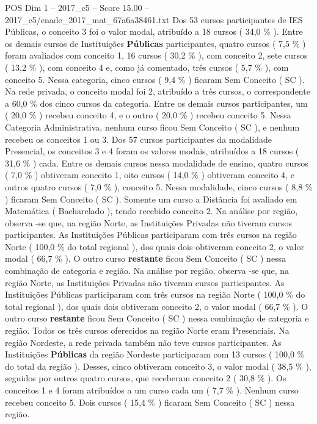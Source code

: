 \begin{textsample}{POS Dim 1 – 2017\_c5 – Score 15.00 – 2017\_c5/enade\_2017\_mat\_67a6a38461.txt}
Dos 53 cursos participantes de IES Públicas, o conceito 3 foi o valor modal, atribuído a 18 cursos ( 34,0 \% ).
Entre os demais cursos de Instituições \textbf{Públicas} participantes, quatro cursos ( 7,5 \% ) foram avaliados com conceito 1, 16 cursos ( 30,2 \% ), com conceito 2, sete cursos ( 13,2 \% ), com conceito 4 e, como já comentado, três cursos ( 5,7 \% ), com conceito 5.
Nessa categoria, cinco cursos ( 9,4 \% ) ficaram Sem Conceito ( SC ).
Na rede privada, o conceito modal foi 2, atribuído a três cursos, o correspondente a 60,0 \% dos cinco cursos da categoria.
Entre os demais cursos participantes, um ( 20,0 \% ) recebeu conceito 4, e o outro ( 20,0 \% ) recebeu conceito 5.
Nessa Categoria Administrativa, nenhum curso ficou Sem Conceito ( SC ), e nenhum recebeu os conceitos 1 ou 3.
Dos 57 cursos participantes da modalidade Presencial, os conceitos 3 e 4 foram os valores modais, atribuídos a 18 cursos ( 31,6 \% ) cada.
Entre os demais cursos nessa modalidade de ensino, quatro cursos ( 7,0 \% ) obtiveram conceito 1, oito cursos ( 14,0 \% ) obtiveram conceito 4, e outros quatro cursos ( 7,0 \% ), conceito 5.
Nessa modalidade, cinco cursos ( 8,8 \% ) ficaram Sem Conceito ( SC ).
Somente um curso a Distância foi avaliado em Matemática ( Bacharelado ), tendo recebido conceito 2.
Na análise por região, observa -se que, na região Norte, as Instituições Privadas não tiveram cursos participantes.
As Instituições Públicas participaram com três cursos na região Norte ( 100,0 \% do total regional ), dos quais dois obtiveram conceito 2, o valor modal ( 66,7 \% ).
O outro curso \textbf{restante} ficou Sem Conceito ( SC ) nessa combinação de categoria e região.
Na análise por região, observa -se que, na região Norte, as Instituições Privadas não tiveram cursos participantes.
As Instituições Públicas participaram com três cursos na região Norte ( 100,0 \% do total regional ), dos quais dois obtiveram conceito 2, o valor modal ( 66,7 \% ).
O outro curso \textbf{restante} ficou Sem Conceito ( SC ) nessa combinação de categoria e região.
Todos os três cursos oferecidos na região Norte eram Presenciais.
Na região Nordeste, a rede privada também não teve cursos participantes.
As Instituições \textbf{Públicas} da região Nordeste participaram com 13 cursos ( 100,0 \% do total da região ).
Desses, cinco obtiveram conceito 3, o valor modal ( 38,5 \% ), seguidos por outros quatro cursos, que receberam conceito 2 ( 30,8 \% ).
Os conceitos 1 e 4 foram atribuídos a um curso cada um ( 7,7 \% ).
Nenhum curso recebeu conceito 5.
Dois cursos ( 15,4 \% ) ficaram Sem Conceito ( SC ) nessa região.

\end{textsample}
